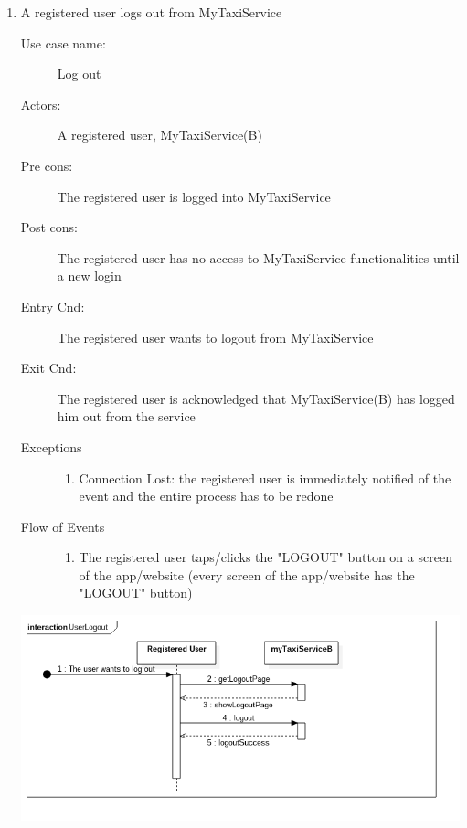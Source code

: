 \documentclass[11pt]{article} %
\begin{document}
\begin{enumerate}
	       \item A registered user logs out from MyTaxiService
		\begin{description}
		        \item [Use case name:] Log out
		        \item [Actors:] A registered user, MyTaxiService(B)
		        \item [Pre cons:] The registered user is logged into MyTaxiService
		        \item [Post cons:] The registered user has no access to MyTaxiService functionalities
		        until a new login
		        \item [Entry Cnd:] The registered user wants to logout from MyTaxiService
		        \item [Exit Cnd:] The registered user is acknowledged that MyTaxiService(B) has logged him out from
		        the service
		        \item [Exceptions]\hfill
			\begin{enumerate}
			          \item Connection Lost: the registered user is immediately notified of the event and the entire process
			          has to be redone
			\end{enumerate}
		        \item [Flow of Events]\hfill
			\begin{enumerate}
			          \item The registered user taps/clicks the "LOGOUT" button on a screen of the app/website
			          (every screen of the app/website has the "LOGOUT" button)
			\end{enumerate}
		\end{description}
		\newpage
		\begin{center}
		\includegraphics[scale=0.52]{usecase7.png}
		\end{center}
	

\end{enumerate}
\end{document}
